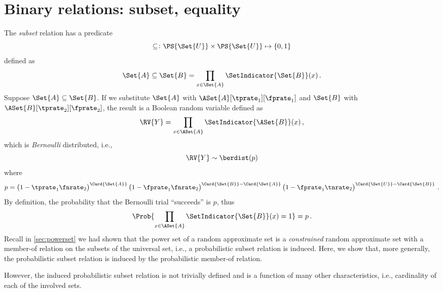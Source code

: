 \documentclass[ ../main.tex]{subfiles}
\begin{document}
\section{Binary relations: subset, equality}
The \emph{subset} relation has a predicate
\begin{equation}
	\subseteq \colon \PS{\Set{U}} \times \PS{\Set{U}} \mapsto \{0,1\}
\end{equation}
defined as
\begin{equation}
	\Set{A} \subseteq \Set{B} = \prod_{x \in \Set{A}} 
	\SetIndicator{\Set{B}}(x)\,.
\end{equation}
Suppose $\Set{A} \subseteq \Set{B}$.
If we substitute $\Set{A}$ with $\ASet{A}[\tprate_1][\fprate_1]$ and $\Set{B}$ with $\ASet{B}[\tprate_2][\fprate_2]$, the result is a Boolean random variable defined as
\begin{equation}
	\RV{Y} = \prod_{x \in \ASet{A}} \SetIndicator{\ASet{B}}(x)\,,
\end{equation}
which is \emph{Bernoulli} distributed, i.e.,
\begin{equation}
	\RV{Y} \sim \berdist(p)
\end{equation}
where
\begin{equation}
	p = \left(1 - \tprate_1 \fnrate_2 \right)^{\Card{\Set{A}}}
\left(1 - \fprate_1\fnrate_2\right)^{\Card{\Set{B}} - \Card{\Set{A}}}
\left(1 - \fprate_1 \tnrate_2\right)^{\Card{\Set{U}} - 
	\Card{\Set{B}}}\,.
\end{equation}
By definition, the probability that the Bernoulli trial ``succeeds'' is $p$, thus
\begin{equation}
	\Prob{\prod_{x \in \ASet{A}} \SetIndicator{\Set{B}}(x) = 1} = p\,.
\end{equation}
Recall in \cref{sec:powerset} we had shown that the power set of a random approximate set is a \emph{constrained} random approximate set with a member-of relation on the subsets of the universal set, i.e., a probabilistic subset relation is induced.
Here, we show that, more generally, the probabilistic subset relation is induced by the probabilistic member-of relation.

However, the induced probabilistic subset relation is not trivially defined and is a function of many other characteristics, i.e., cardinality of each of the involved sets.
\end{document}
